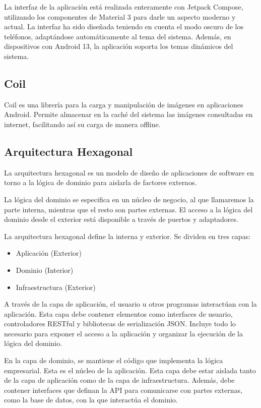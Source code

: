 \documentclass[12pt,twoside,titlepage]{report}
\begin{document}
La interfaz de la aplicación está realizada enteramente con Jetpack Compose, utilizando los componentes de Material 3 para darle un aspecto moderno y actual. La interfaz ha sido diseñada teniendo en cuenta el modo oscuro de los teléfonos, adaptándose automáticamente al tema del sistema. Además, en dispositivos con Android 13, la aplicación soporta los temas dinámicos del sistema.

\subsection{Coil}
\label{sec:Coil}

Coil es una librería para la carga y manipulación de imágenes en aplicaciones Android. Permite almacenar en la caché del sistema las imágenes consultadas en internet, facilitando así su carga de manera offline.

\subsection{Arquitectura Hexagonal}
\label{sec:Arquitectura Hexagonal}

La arquitectura hexagonal\cite{arquitectura-hexagonal} es un modelo de diseño de aplicaciones de software en torno a la lógica de dominio para aislarla de factores externos.

La lógica del dominio se especifica en un núcleo de negocio, al que llamaremos la parte interna, mientras que el resto son partes externas. El acceso a la lógica del dominio desde el exterior está disponible a través de puertos y adaptadores.

La arquitectura hexagonal define la interna y exterior. Se dividen en tres capas:

\begin{itemize}
    \item Aplicación (Exterior)
    \item Dominio (Interior)
    \item Infraestructura (Exterior)
\end{itemize}

A través de la capa de aplicación, el usuario u otros programas interactúan con la aplicación. Esta capa debe contener elementos como interfaces de usuario, controladores RESTful y bibliotecas de serialización JSON. Incluye todo lo necesario para exponer el acceso a la aplicación y organizar la ejecución de la lógica del dominio.

En la capa de dominio, se mantiene el código que implementa la lógica empresarial. Esta es el núcleo de la aplicación. Esta capa debe estar aislada tanto de la capa de aplicación como de la capa de infraestructura. Además, debe contener interfaces que definan la API para comunicarse con partes externas, como la base de datos, con la que interactúa el dominio.
\end{document}
